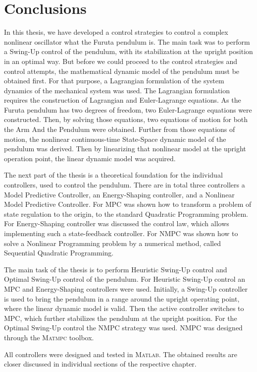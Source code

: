 \chapter{Conclusions}
In this thesis, we have developed a control strategies to control a complex nonlinear oscillator what the Furuta pendulum is. The main task was to perform a Swing-Up control of the pendulum, with its stabilization at the upright position in an optimal way. But before we could proceed to the control strategies and control attempts, the mathematical dynamic model of the pendulum must be obtained first. For that purpose, a Lagrangian formulation of the system dynamics of the mechanical system was used. The Lagrangian formulation requires the construction of Lagrangian and Euler-Lagrange equations. As the Furuta pendulum has two degrees of freedom, two Euler-Lagrange equations were constructed. Then, by solving those equations, two equations of motion for both the Arm And the Pendulum were obtained. Further from those equations of motion, the nonlinear continuous-time State-Space dynamic model of the pendulum was derived. Then by linearizing that nonlinear model at the upright operation point, the linear dynamic model was acquired.

The next part of the thesis is a theoretical foundation for the individual controllers, used to control the pendulum. There are in total three controllers a Model Predictive Controller, an Energy-Shaping controller, and a Nonlinear Model Predictive Controller. For MPC was shown how to transform a problem of state regulation to the origin, to the standard Quadratic Programming problem. For Energy-Shaping controller was discussed the control law, which allows implementing such a state-feedback controller. For NMPC was shown how to solve a Nonlinear Programming problem by a numerical method, called Sequential Quadratic Programming.

The main task of the thesis is to perform Heuristic Swing-Up control and Optimal Swing-Up control of the pendulum. For Heuristic Swing-Up control an MPC and Energy-Shaping controllers were used. Initially, a Swing-Up controller is used to bring the pendulum in a range around the upright operating point, where the linear dynamic model is valid. Then the active controller switches to MPC, which further stabilizes the pendulum at the upright position. For the Optimal Swing-Up control the NMPC strategy was used. NMPC was designed through the \textsc{Matmpc} toolbox.

All controllers were designed and tested in \textsc{Matlab}. The obtained results are closer discussed in individual sections of the respective chapter.